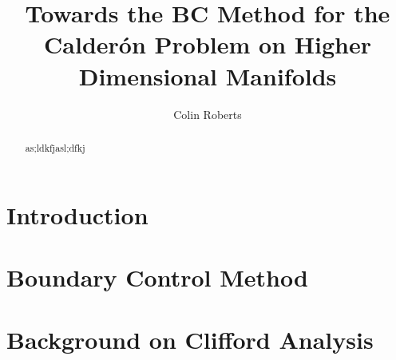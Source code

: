 \documentclass[12pt]{article}
\title{Towards the BC Method for the Calder\'on Problem on Higher Dimensional Manifolds}
\author{Colin Roberts}
\begin{document}
 \begin{titlingpage}
     \maketitle
     \vfill
     \begin{abstract}
        as;ldkfjasl;dfkj
     \end{abstract}
 \end{titlingpage}

\section{Introduction}


\section{Boundary Control Method}


\section{Background on Clifford Analysis}

\end{document}
